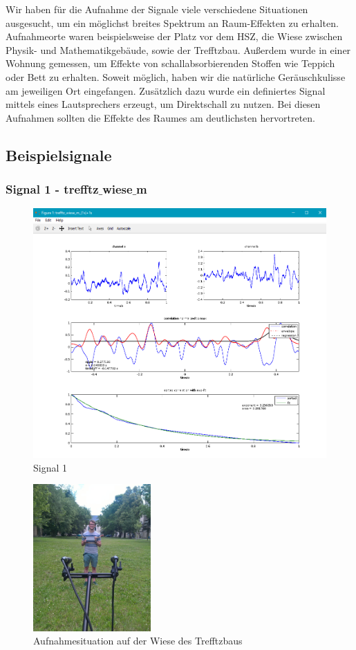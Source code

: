 Wir haben für die Aufnahme der Signale viele verschiedene Situationen ausgesucht, um ein möglichst breites Spektrum an Raum-Effekten zu erhalten. Aufnahmeorte waren beispielsweise der Platz vor dem HSZ, die Wiese zwischen Physik- und Mathematikgebäude, sowie der Trefftzbau. Außerdem wurde in einer Wohnung gemessen, um Effekte von schallabsorbierenden Stoffen wie Teppich oder Bett zu erhalten. Soweit möglich, haben wir die natürliche Geräuschkulisse am jeweiligen Ort eingefangen. Zusätzlich dazu wurde ein definiertes Signal mittels eines Lautsprechers erzeugt, um Direktschall zu nutzen. Bei diesen Aufnahmen sollten die Effekte des Raumes am deutlichsten hervortreten.
\subsection{Beispielsignale}
\subsubsection{Signal 1 - trefftz$\_$wiese$\_$m}
\begin{figure}[ht!]
  \centering
  \includegraphics[scale=0.6]{img/trefftz_wiese_m}
  \caption{Signal 1}
  \label{figure2}
\end{figure}
\begin{figure}[ht!]
  \centering
  \includegraphics[width=0.4\textwidth]{img/wiese}
  \caption{Aufnahmesituation auf der Wiese des Trefftzbaus}
  \label{figure4}
\end{figure}
